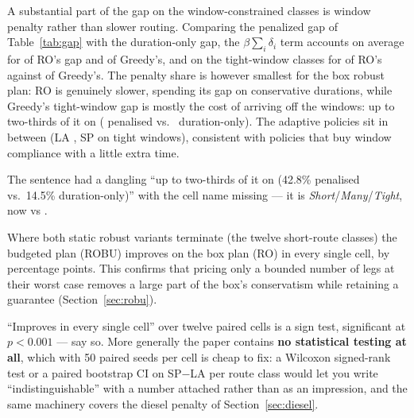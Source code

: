 A substantial part of the gap on the window-constrained classes is window penalty rather than slower routing. Comparing the penalized gap of Table~\ref{tab:gap} with the duration-only gap, the $\beta\sum_i\delta_i$ term accounts on average for  of RO's gap and  of Greedy's, and on the tight-window classes for  of RO's against  of Greedy's. The penalty share is however smallest for the box robust plan: RO is genuinely slower, spending its gap on conservative durations, while Greedy's tight-window gap is mostly the cost of arriving off the windows: up to two-thirds of it on  ( penalised vs.\  duration-only). The adaptive policies sit in between (LA , SP  on tight windows), consistent with policies that buy window compliance with a little extra time. 

\begin{acmt}
The sentence had a dangling ``up to two-thirds of it on (42.8\% penalised
vs.\ 14.5\% duration-only)'' with the cell name missing --- it is
\emph{Short}/\emph{Many}/\emph{Tight}, now  vs .
\end{acmt}

Where both static robust variants terminate (the twelve short-route classes) the budgeted plan (ROBU) improves on the box plan (RO) in every single cell, by  percentage points. This confirms that pricing only a bounded number of legs at their worst case removes a large part of the box's conservatism while retaining a guarantee (Section~\ref{sec:robu}).

\begin{atodo}
``Improves in every single cell'' over twelve paired cells is a sign test,
significant at $p < 0.001$ --- say so. More generally the paper contains
\textbf{no statistical testing at all}, which with 50 paired seeds per cell is
cheap to fix: a Wilcoxon signed-rank test or a paired bootstrap CI on SP$-$LA per
route class would let you write ``indistinguishable'' with a number attached
rather than as an impression, and the same machinery covers the diesel penalty of
Section~\ref{sec:diesel}.
\end{atodo}


